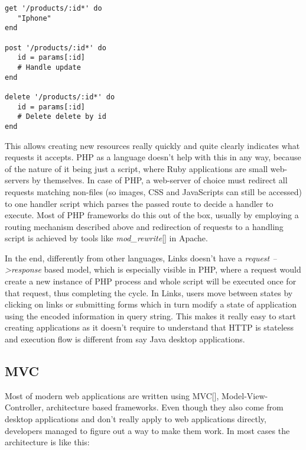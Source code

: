 \begin{codelisting}
\begin{verbatim}
get '/products/:id*' do
   "Iphone"
end

post '/products/:id*' do
   id = params[:id]
   # Handle update
end

delete '/products/:id*' do
   id = params[:id]
   # Delete delete by id
end
\end{verbatim}
\end{codelisting}

This allows creating new resources really quickly and quite clearly indicates what requests it accepts. PHP as a language doesn't help with this in any way, because of the nature of it being just a script, where Ruby applications are small web-servers by themselves. In case of PHP, a web-server of choice must redirect all requests matching non-files (so images, CSS and JavaScripts can still be accessed) to one handler script which parses the passed route to decide a handler to execute. Most of PHP frameworks do this out of the box, usually by employing a routing mechanism described above and redirection of requests to a handling script is achieved by tools like \textit{mod\_rewrite}[] in Apache.

In the end, differently from other languages, Links doesn't have a \textit{request --\textgreater  response} based model, which is especially visible in PHP, where a request would create a new instance of PHP process and whole script will be executed once for that request, thus completing the cycle. In Links, users move between states by clicking on links or submitting forms which in turn modify a state of application using the encoded information in query string. This makes it really easy to start creating applications as it doesn't require to understand that HTTP is stateless and execution flow is different from say Java desktop applications.

\subsection{MVC}

Most of modern web applications are written using MVC[], Model-View-Controller, architecture based frameworks. Even though they also come from desktop applications and don't really apply to web applications directly, developers managed to figure out a way to make them work. In most cases the architecture is like this:

